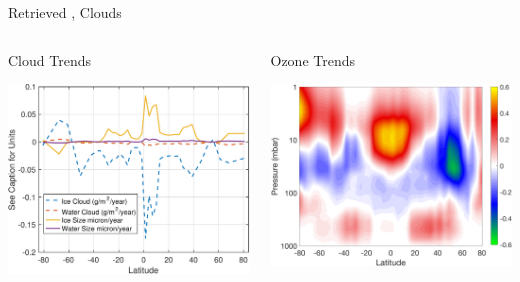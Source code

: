 \documentclass[10pt,t]{beamer}
\begin{document}
\begin{frame}[label={sec:org11e0b32}]{Retrieved \ozone, Clouds}
\vspace{-0.35in}

\begin{columns}
\begin{column}{0.55\columnwidth}
\begin{block}{\footnotesize Cloud Trends}
\vspace{-0.1in}
\begin{center}
\includegraphics[width=0.9\linewidth]{./Figs/Pdf/cloud_trend.pdf}
\end{center}
\end{block}
\end{column}

\begin{column}{0.55\columnwidth}
\begin{block}{\footnotesize Ozone Trends}
\vspace{-0.1in}
\begin{center}
\includegraphics[width=0.9\linewidth]{./Figs/Png/o3_trend_upto_1mbar.png}
\end{center}
\end{block}
\end{column}
\end{columns}



\end{frame}
\end{document}

